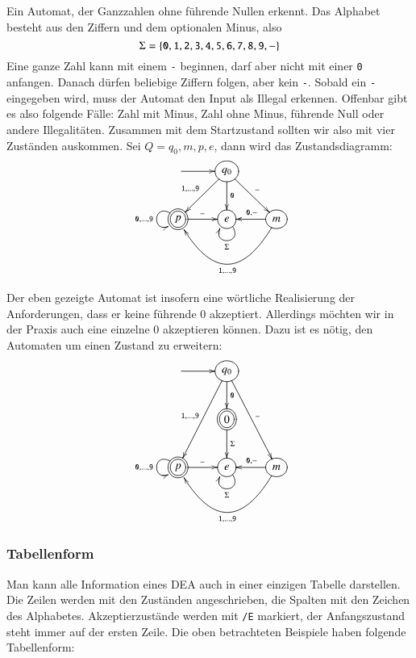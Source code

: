 \begin{beispiel}
Ein Automat, der Ganzzahlen ohne führende Nullen erkennt.
Das Alphabet besteht aus den Ziffern und dem optionalen Minus, also
\[
\Sigma=\{
{\tt 0},
{\tt 1},
{\tt 2},
{\tt 3},
{\tt 4},
{\tt 5},
{\tt 6},
{\tt 7},
{\tt 8},
{\tt 9},
{\tt -}
\}
\]
Eine ganze Zahl kann mit einem {\tt -} beginnen, darf
aber nicht mit einer {\tt 0} anfangen.
Danach dürfen beliebige
Ziffern folgen, aber kein {\tt -}.
Sobald ein {\tt -} eingegeben
wird, muss der Automat den Input als Illegal erkennen.
Offenbar gibt es also folgende Fälle: Zahl mit Minus, Zahl ohne Minus,
führende Null oder andere Illegalitäten.
Zusammen mit dem Startzustand sollten wir also mit vier Zuständen auskommen.
Sei $Q={q_0, m,p,e}$, dann wird das Zustandsdiagramm:
\[
\entrymodifiers={++[o][F]}
\xymatrix{
*+\txt{}\ar[r]
	&{q_0}  \ar[dl]_{{\tt 1},\dots,{\tt 9}} \ar[d]^{\tt 0} \ar[dr]^{\tt -}
\\
*++[o][F=]{p}\ar[r]^{\tt -} \ar@(ul,dl)_{{\tt 0},\dots,{\tt 9}}
	&{e} \ar@(dr,dl)^{\Sigma}
		&{m}\ar[l]_{{\tt 0},{\tt -}} \ar@/^40pt/[ll]^{{\tt 1},\dots,{\tt 9}}
}
\]
\end{beispiel}
\begin{beispiel}
Der eben gezeigte Automat ist insofern eine wörtliche Realisierung
der Anforderungen, dass er keine führende $0$ akzeptiert.
Allerdings
möchten wir in der Praxis auch eine einzelne $0$ akzeptieren können.
Dazu ist es nötig, den Automaten um einen Zustand zu erweitern:
\[
\entrymodifiers={++[o][F]}
\xymatrix{
*+\txt{}\ar[r]
	&{q_0}  \ar[ddl]_{{\tt 1},\dots,{\tt 9}} \ar[d]^{\tt 0} \ar[ddr]^{\tt -}
\\
*+\txt{}
	&*++[o][F=]{0}\ar[d]^{\Sigma}
\\
*++[o][F=]{p}\ar[r]^{\tt -} \ar@(ul,dl)_{{\tt 0},\dots,{\tt 9}}
	&{e} \ar@(dr,dl)^{\Sigma}
		&{m}\ar[l]_{{\tt 0},{\tt -}} \ar@/^40pt/[ll]^{{\tt 1},\dots,{\tt 9}}
}
\]
\end{beispiel}

\subsubsection{Tabellenform}
%
Man kann alle Information eines DEA auch in einer einzigen Tabelle 
darstellen.
Die Zeilen werden mit den Zuständen angeschrieben,
die Spalten mit den Zeichen des Alphabetes.
Akzeptierzustände werden
mit {\tt /E} markiert, der Anfangszustand steht immer auf der ersten
Zeile.
Die oben betrachteten Beispiele haben folgende Tabellenform:

